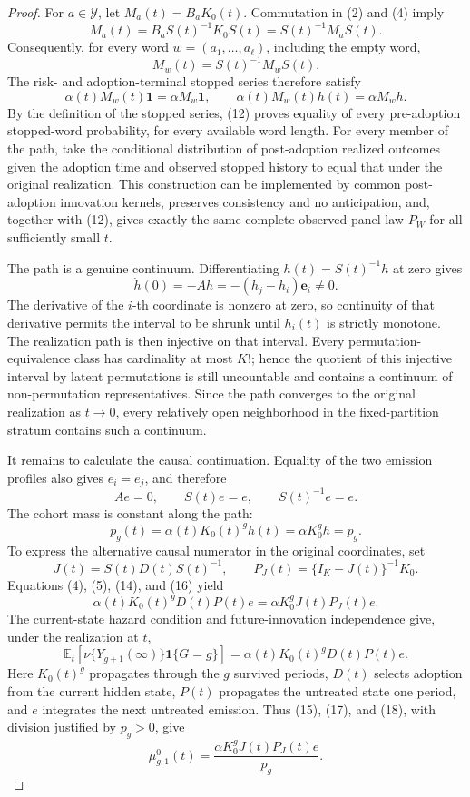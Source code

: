 \documentclass{article}
\begin{document}
\begin{proof}
For \(a\in\mathcal Y\), let \(M_a(t)=B_aK_0(t)\). Commutation in (2) and (4) imply
\[
 M_a(t)=B_aS(t)^{-1}K_0S(t)=S(t)^{-1}M_aS(t).                 \tag{10}
\]
Consequently, for every word \(w=(a_1,\ldots,a_\ell)\), including the empty word,
\[
 M_w(t)=S(t)^{-1}M_wS(t).                                     \tag{11}
\]
The risk- and adoption-terminal stopped series therefore satisfy
\[
 \alpha(t)M_w(t)\mathbf 1
 =\alpha M_w\mathbf 1,\qquad
 \alpha(t)M_w(t)h(t)=\alpha M_wh.                             \tag{12}
\]
By the definition of the stopped series, (12) proves equality of every pre-adoption stopped-word probability, for every available word length. For every member of the path, take the conditional distribution of post-adoption realized outcomes given the adoption time and observed stopped history to equal that under the original realization. This construction can be implemented by common post-adoption innovation kernels, preserves consistency and no anticipation, and, together with (12), gives exactly the same complete observed-panel law \(P_W\) for all sufficiently small \(t\).

The path is a genuine continuum. Differentiating \(h(t)=S(t)^{-1}h\) at zero gives
\[
 \dot h(0)=-Ah=-(h_j-h_i)\mathbf e_i\ne0.                    \tag{13}
\]
The derivative of the \(i\)-th coordinate is nonzero at zero, so continuity of that derivative permits the interval to be shrunk until \(h_i(t)\) is strictly monotone. The realization path is then injective on that interval. Every permutation-equivalence class has cardinality at most \(K!\); hence the quotient of this injective interval by latent permutations is still uncountable and contains a continuum of non-permutation representatives. Since the path converges to the original realization as \(t\to0\), every relatively open neighborhood in the fixed-partition stratum contains such a continuum.

It remains to calculate the causal continuation. Equality of the two emission profiles also gives \(e_i=e_j\), and therefore
\[
 Ae=0,\qquad S(t)e=e,\qquad S(t)^{-1}e=e.                    \tag{14}
\]
The cohort mass is constant along the path:
\[
 p_g(t)=\alpha(t)K_0(t)^gh(t)
 =\alpha K_0^gh=p_g.                                          \tag{15}
\]
To express the alternative causal numerator in the original coordinates, set
\[
 J(t)=S(t)D(t)S(t)^{-1},\qquad
 P_J(t)=\{I_K-J(t)\}^{-1}K_0.                                 \tag{16}
\]
Equations (4), (5), (14), and (16) yield
\[
 \alpha(t)K_0(t)^gD(t)P(t)e
 =\alpha K_0^gJ(t)P_J(t)e.                                    \tag{17}
\]
The current-state hazard condition and future-innovation independence give, under the realization at \(t\),
\[
 \mathbb E_t\!\left[\nu\{Y_{g+1}(\infty)\}\mathbf 1\{G=g\}\right]
 =\alpha(t)K_0(t)^gD(t)P(t)e.                                  \tag{18}
\]
Here \(K_0(t)^g\) propagates through the \(g\) survived periods, \(D(t)\) selects adoption from the current hidden state, \(P(t)\) propagates the untreated state one period, and \(e\) integrates the next untreated emission. Thus (15), (17), and (18), with division justified by \(p_g>0\), give
\[
 \mu^0_{g,1}(t)=\frac{\alpha K_0^gJ(t)P_J(t)e}{p_g}.          \tag{19}
\]


\end{proof}
\end{document}

